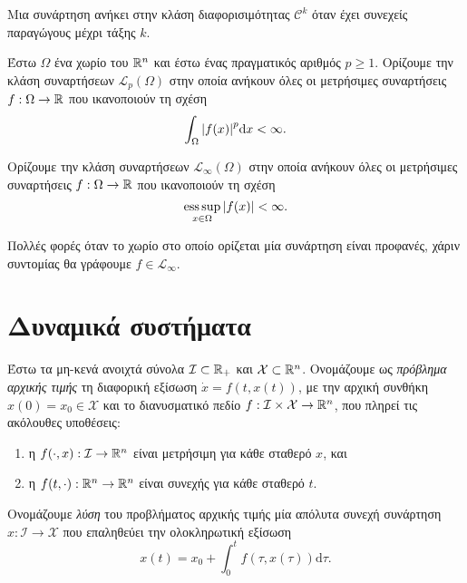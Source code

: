     \begin{definition}
        Μια συνάρτηση ανήκει στην κλάση διαφορισιμότητας $\mathcal C^k$ όταν έχει συνεχείς παραγώγους μέχρι τάξης $k$.
    \end{definition}

    \begin{definition}
        Έστω $\Omega$ ένα χωρίο του $\mathbb{R}^n$ και έστω ένας πραγματικός αριθμός $p \geq 1$. Ορίζουμε την κλάση συναρτήσεων $\mathcal L_p(\Omega)$ στην οποία ανήκουν όλες οι μετρήσιμες συναρτήσεις $f: \Omega \rightarrow \mathbb{R}$ που ικανοποιούν τη σχέση
        \[
            \int_\Omega \abs{f(x)}^p \mathrm d x < \infty.
        \]
    \end{definition}

    \begin{definition}
        Ορίζουμε την κλάση συναρτήσεων $\mathcal L_\infty(\Omega)$ στην οποία ανήκουν όλες οι μετρήσιμες συναρτήσεις $f:\Omega \rightarrow \mathbb{R}$ που ικανοποιούν τη σχέση
        \[
            \operatorname*{ess\,sup}_{x\in\Omega} \abs{f(x)} < \infty.
        \]
    \end{definition}

    \begin{convention}
        Πολλές φορές όταν το χωρίο στο οποίο ορίζεται μία συνάρτηση είναι προφανές, χάριν συντομίας θα γράφουμε $f \in \mathcal L_\infty$.
    \end{convention}

\section{Δυναμικά συστήματα}

    \begin{definition}
        \label{def:ivp}
        Έστω τα μη-κενά ανοιχτά σύνολα $\mathcal I \subset \mathbb{R}_+$ και $\mathcal X \subset \mathbb{R}^n$. Ονομάζουμε ως \emph{πρόβλημα αρχικής τιμής} τη διαφορική εξίσωση $\dot x = f(t, x(t))$, με την αρχική συνθήκη $x(0) = x_0 \in \mathcal X$ και το διανυσματικό πεδίο $f:\mathcal I\times \mathcal X \rightarrow \mathbb{R}^n$, που πληρεί τις ακόλουθες υποθέσεις:
        \begin{enumerate}
            \item η $f(\cdot, x): \mathcal I \rightarrow \mathbb{R}^n$ είναι μετρήσιμη για κάθε σταθερό $x$, και
            \item η $f(t, \cdot): \mathbb{R}^n \rightarrow \mathbb{R}^n$ είναι συνεχής για κάθε σταθερό $t$.
        \end{enumerate}
        Ονομάζουμε \emph{λύση} του προβλήματος αρχικής τιμής μία απόλυτα συνεχή συνάρτηση $x: \mathcal I \rightarrow \mathcal X$ που επαληθεύει την ολοκληρωτική εξίσωση
        \[
            x(t) = x_0 + \int_0^t f(\tau, x(\tau)) \mathrm d\tau.
        \]
    \end{definition}

